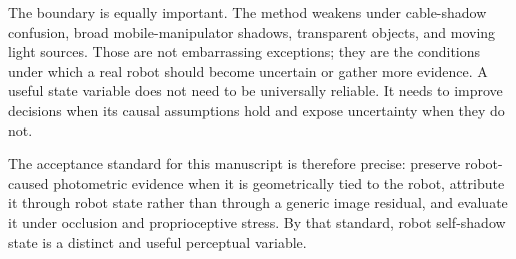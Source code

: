 \documentclass{article}
\begin{document}
The boundary is equally important. The method weakens under cable-shadow confusion, broad mobile-manipulator shadows, transparent objects, and moving light sources. Those are not embarrassing exceptions; they are the conditions under which a real robot should become uncertain or gather more evidence. A useful state variable does not need to be universally reliable. It needs to improve decisions when its causal assumptions hold and expose uncertainty when they do not.

The acceptance standard for this manuscript is therefore precise: preserve robot-caused photometric evidence when it is geometrically tied to the robot, attribute it through robot state rather than through a generic image residual, and evaluate it under occlusion and proprioceptive stress. By that standard, robot self-shadow state is a distinct and useful perceptual variable.



\end{document}
